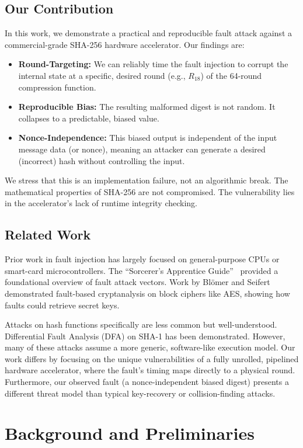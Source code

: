 \documentclass[11pt, a4paper]{article}
\begin{document}
\subsection*{Our Contribution}
In this work, we demonstrate a practical and reproducible fault attack against a commercial-grade SHA-256 hardware accelerator. Our findings are:
\begin{itemize}
    \item \textbf{Round-Targeting:} We can reliably time the fault injection to corrupt the internal state at a specific, desired round (e.g., $R_{18}$) of the 64-round compression function.
    \item \textbf{Reproducible Bias:} The resulting malformed digest is not random. It collapses to a predictable, biased value.
    \item \textbf{Nonce-Independence:} This biased output is independent of the input message data (or nonce), meaning an attacker can generate a desired (incorrect) hash without controlling the input.
\end{itemize}
We stress that this is an implementation failure, not an algorithmic break. The mathematical properties of SHA-256 are not compromised. The vulnerability lies in the accelerator's lack of runtime integrity checking.

\subsection*{Related Work}
Prior work in fault injection has largely focused on general-purpose CPUs or smart-card microcontrollers. The ``Sorcerer's Apprentice Guide''~\cite{bar-el2006fault} provided a foundational overview of fault attack vectors. Work by Bl\"omer and Seifert~\cite{blomer2003fault} demonstrated fault-based cryptanalysis on block ciphers like AES, showing how faults could retrieve secret keys.

Attacks on hash functions specifically are less common but well-understood. Differential Fault Analysis (DFA) on SHA-1 has been demonstrated. However, many of these attacks assume a more generic, software-like execution model. Our work differs by focusing on the unique vulnerabilities of a fully unrolled, pipelined hardware accelerator, where the fault's timing maps directly to a physical round. Furthermore, our observed fault (a nonce-independent biased digest) presents a different threat model than typical key-recovery or collision-finding attacks.

\section{Background and Preliminaries}
\end{document}
